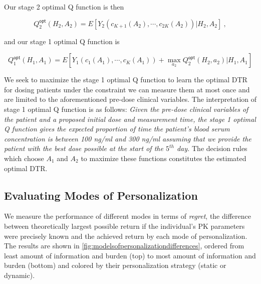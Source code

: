Our stage 2 optimal Q function is then

\begin{equation}
Q_{2}^{\mathsf{opt}}\left(H_{2}, A_{2}\right)=E\left[Y_2\left(c_{K+1}(A_2), \cdots, c_{2K}(A_2)\right) \Bigg\vert H_{2}, A_{2}\right] \>,
\end{equation}

\noindent and our stage 1 optimal Q function is

\begin{equation}
Q_{1}^{\mathsf{opt}}\left(H_{1}, A_{1}\right)= E \left[Y_1\left(c_{1}(A_1),  \cdots, c_{K}(A_1)\right)+\max _{a_{2}} Q_{2}^{\mathsf{opt}}\left(H_{2}, a_{2}\right) \Bigg\vert H_{1}, A_{1}\right]
\end{equation}

We seek to maximize the stage 1 optimal Q function to learn the optimal DTR for dosing patients under the constraint we can measure them at most once and are limited to the aforementioned pre-dose clinical variables.  The interpretation of stage 1 optimal Q function is as follows:\textit{ Given the pre-dose clinical variables of the patient and a proposed initial dose and measurement time, the stage 1 optimal Q function gives the expected proportion of time the patient’s blood serum concentration is between 100 ng/ml and 300 ng/ml assuming that we provide the patient with the best dose possible at the start of the $ 5^{th} $ day.}  The decision rules which choose $ A_1 $ and $ A_2 $ to maximize these functions constitutes the estimated optimal DTR.

%

\subsection{Evaluating Modes of Personalization}

We measure the performance of different modes in terms of \textit{regret}, the difference between theoretically largest possible return if the individual's PK parameters were precisely known and the achieved return by each mode of personalization. The results are shown in \cref{fig:modelsofpersonalizationdifferences}, ordered from least amount of information and burden (top) to most amount of information and burden (bottom) and colored by their personalization strategy (static or dynamic).


